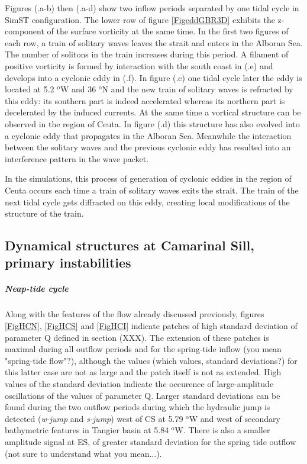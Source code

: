Figures (.a-b) then (.a-d) show two inflow periods separated by one tidal cycle in SimST configuration. The lower row of \color{blue} figure \ref{FigeddGBR3D} exhibits the z-component of the surface vorticity \color{black} at the same time. In the first two figures of each row, a train of solitary waves leaves the strait \color{blue} and enters in the Alboran Sea. The number of solitons in the train increases during this period. \color{black} A filament of positive vorticity is formed by interaction with the south coast in (.e) and develops into a cyclonic eddy in (.f).  \color{blue}In figure (.c) one tidal cycle later the eddy is located at 5.2 $^\text{o}$W and 36 $^\text{o}$N and the new train of solitary waves is refracted by this eddy: its southern part is indeed accelerated whereas its northern part is decelerated by the induced currents. At the same time a vortical structure can be observed in the region of Ceuta. In figure (.d) this structure has also evolved into \color{black} a cyclonic eddy that propagates in the Alboran Sea. Meanwhile the interaction between the solitary waves and the previous cyclonic eddy has resulted into an interference pattern in the wave packet. 


In the simulations, this process of generation of cyclonic eddies \color{blue} in the region of Ceuta \color{black} occurs each time a train of solitary waves exits the strait.  The train of the next tidal cycle gets diffracted on this eddy, creating local \color{blue}modifications of the structure of the train. \color{black}


\subsection{Dynamical structures at Camarinal Sill, primary instabilities}

\subparagraph{Neap-tide cycle}

Along with the features of the flow already discussed previously, figures \ref{FigHCN}, \ref{FigHCS} and \ref{FigHCI} indicate patches of high standard deviation of parameter Q \color{blue} defined in section (XXX). The extension of these patches is maximal during all outflow periods \color{black} and for the spring-tide inflow  \color{green} (you mean "spring-tide flow"?), \color{black} although the values  \color{green}(which values, standard deviations?) \color{black} for this latter case are not as large and the patch itself is not as extended. High values of the \color{blue} standard deviation \color{black} indicate the occurence of large-amplitude oscillations of the values of parameter Q. \color{blue} Larger standard deviations can be found during the two outflow periods during which the hydraulic jump \color{black} is detected (\textit{w-jump} and \textit{s-jump}) west of CS at 5.79 $^\text{o}$W and west of secondary bathymetric features in Tangier basin at 5.84 $^\text{o}$W. There is also \color{blue} a smaller amplitude \color{black} signal at ES, of greater standard deviation for the spring tide outflow \color{green}(not sure to understand what you mean...). \color{black}

